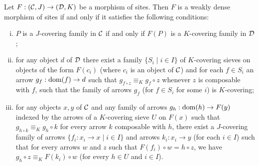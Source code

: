 \documentclass[a4paper,12pt]{article}
\begin{document}
\begin{proposition}\label{propweaklydensemorphism}
	Let $F:({\cal C}, J)\to ({\cal D}, K)$ be a morphism of sites. Then $F$ is a weakly dense morphism of sites if and only if it satisfies the following conditions:
	\begin{enumerate}[(i)]
	\item $P$ is a $J$-covering family in $\cal C$ if and only if $F(P)$ is a $K$-covering family in $\cal D$;
	
    \item for any object $d$ of $\cal D$ there exist a family $\{S_{i} \mid i\in I\}$ of $K$-covering sieves on objects of the form $F(c_{i})$ (where $c_{i}$ is an object of $\cal C$) and for each $f\in S_{i}$ an arrow $g_{f}:\textup{dom}(f)\to d$ such that $g_{f\circ z}\equiv_{K} g_{f}\circ z$ whenever $z$ is composable with $f$, such that the family of arrows $g_{f}$ (for $f\in S_{i}$ for some $i$) is $K$-covering;  
   
    \item for any objects $x, y$ of ${\cal C}$ and any family of arrows $g_{h}:\textup{dom}(h)\to F(y)$ indexed by the arrows of a $K$-covering sieve $U$ on $F(x)$ such that $g_{h\circ k}\equiv_{K} g_{h}\circ k$ for every arrow $k$ composable with $h$, there exist a $J$-covering family of arrows $\{f_{i}:x_{i}\to x \mid  i\in I\}$ and arrows $k_{i}:x_{i}\to y$ (for each $i\in I$) such that for every arrows $w$ and $z$ such that $F(f_{i})\circ w=h\circ z$, we have $g_{h}\circ z\equiv_{K} F(k_{i})\circ w$ (for every $h\in U$ and $i\in I$).
	\end{enumerate}
\end{proposition}
\end{document}
